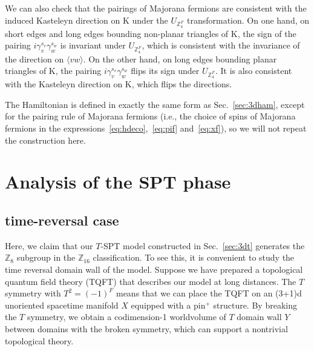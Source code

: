 \documentclass[12pt]{article}
\numberwithin{equation}{section}
\begin{document}
We can also check that the pairings of Majorana fermions are consistent with the induced Kasteleyn direction on $\mathrm{K}$ under the $U_{\mathbb{Z}_4^F}$ transformation. 
On one hand, on short edges and long edges bounding non-planar triangles of $\mathrm{K}$, the sign of the pairing $i\gamma_v^{s_v}\gamma_{w}^{s_w}$ is invariant under $U_{\mathbb{Z}_4^F}$, which is consistent with the invariance of the direction on $\langle vw\rangle$. 
On the other hand, on long edges bounding planar triangles of $\mathrm{K}$, the pairing $i\gamma_v^{s_v}\gamma_{w}^{s_w}$ flips its sign under $U_{\mathbb{Z}_4^F}$. 
It is also consistent with the Kasteleyn direction on $\mathrm{K}$, which flips the directions.

The Hamiltonian is defined in exactly the same form as Sec.~\ref{sec:3dham}, except for the pairing rule of Majorana fermions (i.e., the choice of spins of Majorana fermions in the expressions~\eqref{eq:hdeco},~\eqref{eq:pif} and~\eqref{eq:xf}), so we will not repeat the construction here.


\section{Analysis of the SPT phase}
\label{sec:wallspt}

\subsection{time-reversal case}
Here, we claim that our $T$-SPT model constructed in Sec.~\ref{sec:3dt} generates the $\mathbb{Z}_8$ subgroup in the $\mathbb{Z}_{16}$ classification. 
To see this, it is convenient to study the time reversal domain wall of the model.
Suppose we have prepared a topological quantum field theory (TQFT) that describes our model at long distances. The $T$ symmetry with $T^2=(-1)^F$ means that we can place the TQFT on an (3+1)d unoriented spacetime manifold $X$ equipped with a pin$^+$ structure. By breaking the $T$ symmetry, we obtain a codimension-1 worldvolume of $T$ domain wall $Y$ between domains with the broken symmetry, which can support a nontrivial topological theory. 
\end{document}
